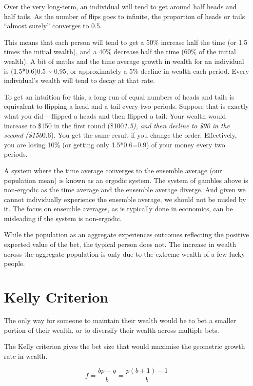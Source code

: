 \documentclass[
]{book}
\begin{document}
Over the very long-term, an individual will tend to get around half heads and half tails. As the number of flips goes to infinite, the proportion of heads or tails ``almost surely'' converges to 0.5.

This means that each person will tend to get a 50\% increase half the time (or 1.5 times the initial wealth), and a 40\% decrease half the time (60\% of the initial wealth). A bit of maths and the time average growth in wealth for an individual is (1.5*0.6)0.5 \textasciitilde{} 0.95, or approximately a 5\% decline in wealth each period. Every individual's wealth will tend to decay at that rate.

To get an intuition for this, a long run of equal numbers of heads and tails is equivalent to flipping a head and a tail every two periods. Suppose that is exactly what you did -- flipped a heads and then flipped a tail. Your wealth would increase to \$150 in the first round (\$100\emph{1.5), and then decline to \$90 in the second (\$150}0.6). You get the same result if you change the order. Effectively, you are losing 10\% (or getting only 1.5*0.6=0.9) of your money every two periods.

A system where the time average converges to the ensemble average
(our population mean) is known as an ergodic system.
The system of gambles above is non-ergodic as the time average
and the ensemble average diverge.
And given we cannot individually experience the ensemble average,
we should not be misled by it.
The focus on ensemble averages, as is typically done in economics,
can be misleading if the system is non-ergodic.

While the population as an aggregate experiences outcomes reflecting
the positive expected value of the bet, the typical person does not.
The increase in wealth across the aggregate population is only
due to the extreme wealth of a few lucky people.

\hypertarget{kelly-criterion}{%
\section{Kelly Criterion}\label{kelly-criterion}}

The only way for someone to maintain their wealth would be
to bet a smaller portion of their wealth,
or to diversify their wealth across multiple bets.

The Kelly criterion gives the bet size that would maximise the geometric growth rate in wealth.

\[f = \frac{bp-q}{b} = \frac{p(b+1)-1}{b}\]
\end{document}
